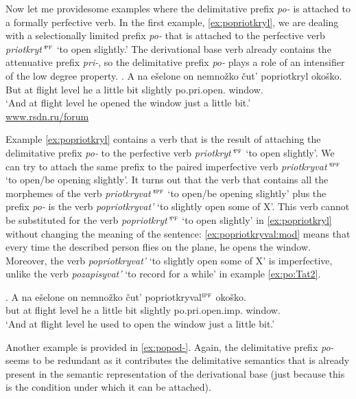 Now let me providesome examples where the delimitative prefix \textit{po-} is attached to a formally perfective verb. In the first example, \ref{ex:popriotkryl}, we are dealing with a selectionally limited prefix \textit{po-} that is attached to the perfective verb \textit{priotkryt'}$^{\textsc{pf}}$ `to open slightly.' The derivational base verb already contains the attenuative prefix \textit{pri-}, so the delimitative prefix \textit{po-} plays a role of an intensifier of the low degree property. 
\exg. \label{ex:popriotkryl}A na e\v{s}elone on nemno\v{z}ko \v{c}ut' popriotkryl oko\v{s}ko.\\
But at {flight level} he {a little bit} {slightly} po.pri.open. window.\\
\trans `And at flight level he opened the window just a little bit.'\\\hbox{}\hfill\hbox{\url{www.rsdn.ru/forum}}

Example \ref{ex:popriotkryl} contains a verb that is the result of attaching the delimitative prefix \textit{po-} to the perfective verb \textit{priotkryt'}$^{\textsc{pf}}$ `to open slightly'. We can try to attach the same prefix to the paired imperfective verb \textit{priotkryvat'}$^{\textsc{ipf}}$ `to open/be opening slightly'. It turns out that the verb that contains all the morphemes of the verb \textit{priotkryvat'}$^{\textsc{ipf}}$ `to open/be opening slightly' plus the prefix \textit{po-} is the verb \textit{popriotkryvat'} `to slightly open some of X'. This verb cannot be substituted for the verb \textit{popriotkryt'}$^{\textsc{pf}}$ `to open slightly' in \ref{ex:popriotkryl} without changing the meaning of the sentence: \ref{ex:popriotkryval:mod} means that every time the described person flies on the plane, he opens the window. Moreover, the verb \textit{popriotkryvat'} `to slightly open some of X' is imperfective, unlike the verb \textit{pozapisyvat'} `to record for a while' in example \ref{ex:po:Tat2}.

\exg. \label{ex:popriotkryval:mod}A na e\v{s}elone on nemno\v{z}ko \v{c}ut' popriotkryval$^{\textsc{ipf}}$ oko\v{s}ko.\\
but at {flight level} he {a little bit} {slightly} po.pri.open.imp. window.\\
\trans `And at flight level he used to open the window just a little bit.'

Another example is provided in \ref{ex:popod-}. Again, the delimitative prefix \textit{po-} seems to be redundant as it contributes the delimitative semantics that is already present in the semantic representation of the derivational base (just because this is the condition under which it can be attached).

